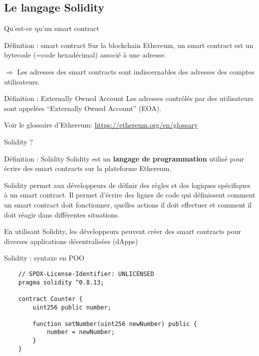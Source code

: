 \subsection{Le langage Solidity}

\begin{frame}{Qu'est-ce qu'un smart contract}
  \begin{block}{Définition : smart contract}
    Sur la blockchain Ethereum, un smart contract est un bytecode (=code hexadécimal) associé à une adresse.

    $\Rightarrow$ Les adresses des smart contracts sont indiscernables des adresses des comptes utilisateurs.
  \end{block}

  \begin{block}{Définition : Externally Owned Account}
    Les adresses contrôlés par des utilisateurs sont appelées \enquote{Externally Owned Account} (EOA).
  \end{block}

  Voir le glossaire d'Ethereum: \url{https://ethereum.org/en/glossary}
\end{frame}

\begin{frame}{Solidity ?}
  \begin{block}{Définition : Solidity}
    Solidity est un \textbf{langage de programmation} utilisé pour écrire des smart contracts sur la plateforme Ethereum.

    Solidity permet aux développeurs de définir des règles et des logiques spécifiques à un smart contract.
    Il permet d'écrire des lignes de code qui définissent comment un smart contract doit fonctionner, quelles actions il doit effectuer et comment il doit réagir dans différentes situations.

    En utilisant Solidity, les développeurs peuvent créer des smart contracts pour diverses applications décentralisées (dApps)
  \end{block}
\end{frame}

\begin{frame}[fragile]{Solidity : syntaxe en POO}
  \begin{verbatim}
    // SPDX-License-Identifier: UNLICENSED
    pragma solidity ^0.8.13;
    
    contract Counter {
        uint256 public number;
    
        function setNumber(uint256 newNumber) public {
            number = newNumber;
        }
    }
  \end{verbatim}
\end{frame}


